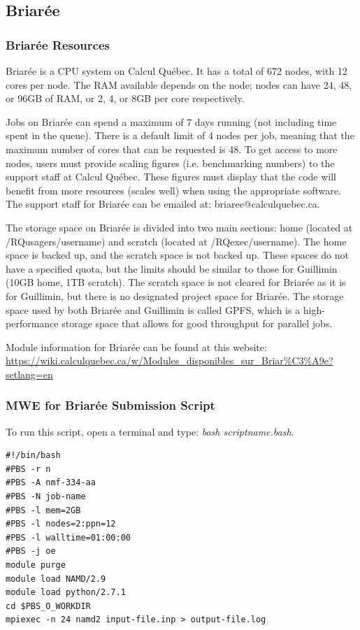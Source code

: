 \documentclass[12pt]{article}
\begin{document}
\subsection{Briar\'{e}e}

\subsubsection{Briar\'{e}e Resources}

\quad Briar\'{e}e is a CPU system on Calcul Qu\'{e}bec. It has a total of 672 nodes, with 12 cores per node. The RAM available depends on the node; nodes can have 24, 48, or 96GB of RAM, or 2, 4, or 8GB per core respectively.

\quad Jobs on Briar\'{e}e can spend a maximum of 7 days running (not including time spent in the queue). There is a default limit of 4 nodes per job, meaning that the maximum number of cores that can be requested is 48. To get access to more nodes, users must provide scaling figures (i.e. benchmarking numbers) to the support staff at Calcul Qu\'{e}bec. These figures must display that the code will benefit from more resources (scales well) when using the appropriate software. The support staff for Briar\'{e}e can be emailed at: briaree@calculquebec.ca.

\quad The storage space on Briar\'{e}e is divided into two main sections: home (located at /RQusagers/username) and scratch (located at /RQexec/username). The home space is backed up, and the scratch space is not backed up. These spaces do not have a specified quota, but the limits should be similar to those for Guillimin (10GB home, 1TB scratch). The scratch space is not cleared for Briar\'{e}e as it is for Guillimin, but there is no designated project space for Briar\'{e}e. The storage space used by both Briar\'{e}e and Guillimin is called GPFS, which is a high-performance storage space that allows for good throughput for parallel jobs.

\quad Module information for Briar\'{e}e can be found at this website: \url{https://wiki.calculquebec.ca/w/Modules_disponibles_sur_Briar%C3%A9e?setlang=en}

\subsubsection{MWE for Briar\'{e}e Submission Script}
\quad To run this script, open a terminal and type: \textit{bash scriptname.bash}. 
\begin{lstlisting}
#!/bin/bash
#PBS -r n
#PBS -A nmf-334-aa
#PBS -N job-name
#PBS -l mem=2GB
#PBS -l nodes=2:ppn=12
#PBS -l walltime=01:00:00
#PBS -j oe
module purge
module load NAMD/2.9
module load python/2.7.1
cd $PBS_O_WORKDIR
mpiexec -n 24 namd2 input-file.inp > output-file.log
\end{lstlisting}
\end{document}
